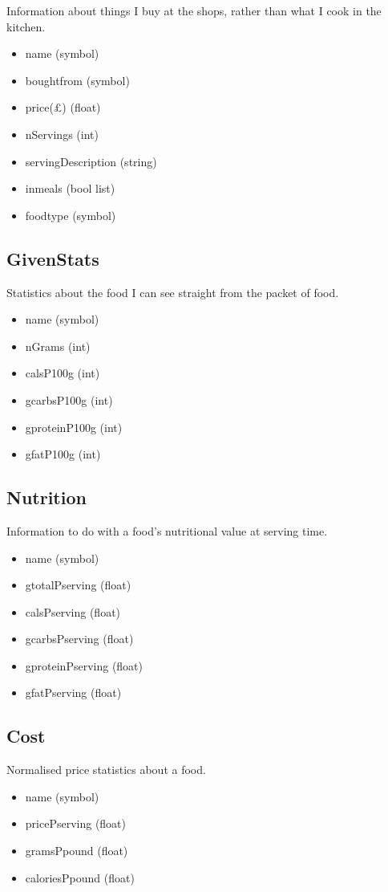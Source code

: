 \documentclass[a4paper]{article}
\begin{document}
Information about things I buy at the shops, rather than what I cook in the 
kitchen.

\begin{itemize}
  \item name (symbol)
  \item boughtfrom (symbol)
  \item price(£) (float)
  \item nServings (int)
  \item servingDescription (string)
  \item inmeals (bool list)
  \item foodtype (symbol)
\end{itemize}

\subsection{GivenStats}

Statistics about the food I can see straight from the packet of food.

\begin{itemize}
  \item name (symbol)
  \item nGrams (int)
  \item calsP100g (int)
  \item gcarbsP100g (int)
  \item gproteinP100g (int)
  \item gfatP100g (int)
\end{itemize} 
  
\subsection{Nutrition}

Information to do with a food's nutritional value at serving time.

\begin{itemize}
  \item name (symbol)
  \item gtotalPserving (float)
  \item calsPserving (float)
  \item gcarbsPserving (float)
  \item gproteinPserving (float)
  \item gfatPserving (float)
\end{itemize}

\subsection{Cost}

Normalised price statistics about a food.

\begin{itemize}
  \item name (symbol)
  \item pricePserving (float)
  \item gramsPpound (float)
  \item caloriesPpound (float)
\end{itemize}
\end{document}
